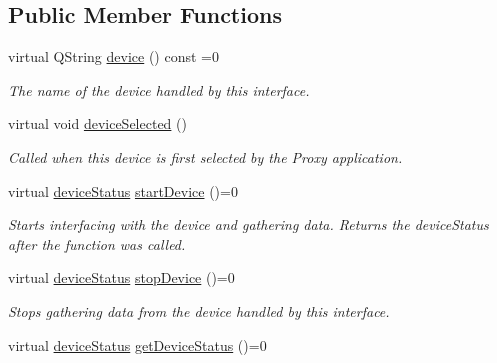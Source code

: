 \subsection*{Public Member Functions}
\begin{DoxyCompactItemize}
\item 
\hypertarget{class_neural_data_acq_interface_a45d5b4ca74321f8dcb42fb9b1cbbb5af}{virtual Q\-String \hyperlink{class_neural_data_acq_interface_a45d5b4ca74321f8dcb42fb9b1cbbb5af}{device} () const =0}\label{class_neural_data_acq_interface_a45d5b4ca74321f8dcb42fb9b1cbbb5af}

\begin{DoxyCompactList}\small\item\em The name of the device handled by this interface. \end{DoxyCompactList}\item 
\hypertarget{class_neural_data_acq_interface_aef94eca149e9cf0c1102aa071cfd7f07}{virtual void \hyperlink{class_neural_data_acq_interface_aef94eca149e9cf0c1102aa071cfd7f07}{device\-Selected} ()}\label{class_neural_data_acq_interface_aef94eca149e9cf0c1102aa071cfd7f07}

\begin{DoxyCompactList}\small\item\em Called when this device is first selected by the Proxy application. \end{DoxyCompactList}\item 
virtual \hyperlink{class_neural_data_acq_interface_a18d2ffb89521e40cba91a159e47fd449}{device\-Status} \hyperlink{class_neural_data_acq_interface_afaece5bd061753aa9a4b1e05c0d1e61d}{start\-Device} ()=0
\begin{DoxyCompactList}\small\item\em Starts interfacing with the device and gathering data. Returns the device\-Status after the function was called. \end{DoxyCompactList}\item 
\hypertarget{class_neural_data_acq_interface_aabca3fa3e737a42c158960d98c541bb8}{virtual \hyperlink{class_neural_data_acq_interface_a18d2ffb89521e40cba91a159e47fd449}{device\-Status} \hyperlink{class_neural_data_acq_interface_aabca3fa3e737a42c158960d98c541bb8}{stop\-Device} ()=0}\label{class_neural_data_acq_interface_aabca3fa3e737a42c158960d98c541bb8}

\begin{DoxyCompactList}\small\item\em Stops gathering data from the device handled by this interface. \end{DoxyCompactList}\item 
\hypertarget{class_neural_data_acq_interface_abbbf0983f4f2b240d92f4ad3b619cab0}{virtual \hyperlink{class_neural_data_acq_interface_a18d2ffb89521e40cba91a159e47fd449}{device\-Status} \hyperlink{class_neural_data_acq_interface_abbbf0983f4f2b240d92f4ad3b619cab0}{get\-Device\-Status} ()=0}\label{class_neural_data_acq_interface_abbbf0983f4f2b240d92f4ad3b619cab0}


\end{DoxyCompactItemize}
